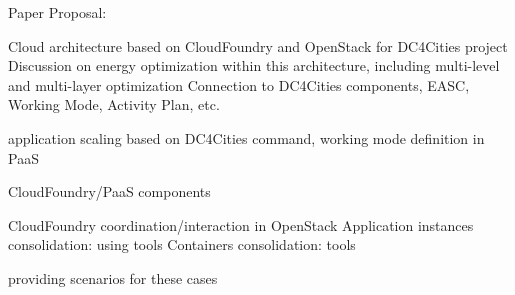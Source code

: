 

Paper Proposal:

Cloud architecture based on CloudFoundry and OpenStack for DC4Cities project
Discussion on energy optimization within this architecture, including multi-level and multi-layer optimization
Connection to DC4Cities components, EASC, Working Mode, Activity Plan, etc.

application scaling based on DC4Cities command,
working mode definition in PaaS

CloudFoundry/PaaS components

CloudFoundry coordination/interaction in OpenStack
Application instances consolidation: using tools
Containers consolidation: tools


providing scenarios for these cases
